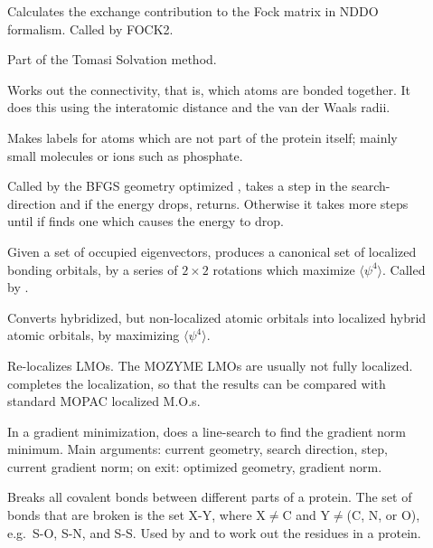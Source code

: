 \begin{description}
\item[] Calculates the exchange contribution to the Fock matrix in
NDDO formalism. Called by FOCK2.

\item[] Part of the Tomasi Solvation method.

\item[] Works out the connectivity, that is, which atoms are bonded
together.  It does this using the interatomic distance and the van der Waals
radii.

\item[] Makes labels for atoms which are not part of the protein
itself; mainly small molecules or ions such as phosphate.

\item[] Called by the BFGS geometry optimized ,
 takes a step in the search-direction and if the energy drops,
returns.  Otherwise it takes more steps until if finds one which causes the
energy to drop.

\item[] Given a set of occupied eigenvectors, produces a  canonical
set of localized bonding orbitals, by a series of  $2\times 2$ rotations which
maximize $\langle \psi^4 \rangle$.  Called by .

\item[] Converts hybridized, but non-localized atomic orbitals
into localized hybrid atomic orbitals, by maximizing  $\langle \psi^4 \rangle$.

\item[] Re-localizes LMOs.  The MOZYME LMOs are usually not
fully localized.   completes the localization, so that the results
can be compared with standard MOPAC localized M.O.s.

\item[] In a gradient minimization,  does a 
line-search to find the gradient norm minimum. Main arguments: current
geometry, search direction, step, current gradient  norm; on exit: optimized
geometry, gradient norm.

\item[] Breaks all covalent bonds between different parts of a
protein.  The set of bonds that are broken is the set X-Y, where X$\neq$C and
Y$\neq$(C, N, or O), e.g.\ S-O, S-N, and S-S.  Used by  and
 to work out the residues in a protein.


\end{description}

